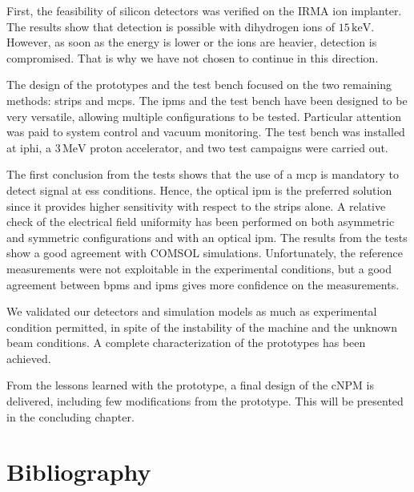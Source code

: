 \begin{refsection}
  First, the feasibility of silicon detectors was verified on the IRMA ion implanter. The results show that detection is possible with dihydrogen ions of $15\,\mathrm{keV}$. However, as soon as the energy is lower or the ions are heavier, detection is compromised. That is why we have not chosen to continue in this direction.

  The design of the prototypes and the test bench focused on the two remaining methods: strips and \acrshort{mcp}s. The \acrshort{ipm}s and the test bench have been designed to be very versatile, allowing multiple configurations to be tested. Particular attention was paid to system control and vacuum monitoring. The test bench was installed at \acrshort{iphi}, a $3\,\mathrm{MeV}$ proton accelerator, and two test campaigns were carried out.

  The first conclusion from the tests shows that the use of a \acrshort{mcp} is mandatory to detect signal at \acrshort{ess} conditions. Hence, the optical \acrshort{ipm} is the preferred solution since it provides higher sensitivity with respect to the strips alone. A relative check of the electrical field uniformity has been performed on both asymmetric and symmetric configurations and with an optical \acrshort{ipm}. The results from the tests show a good agreement with COMSOL simulations.
  Unfortunately, the reference measurements were not exploitable in the experimental conditions, but a good agreement between \acrshort{bpm}s and \acrshort{ipm}s gives more confidence on the measurements.

  We validated our detectors and simulation models as much as experimental condition permitted, in spite of the instability of the machine and the unknown beam conditions. A complete characterization of the prototypes has been achieved.

  From the lessons learned with the prototype, a final design of the cNPM is delivered, including few modifications from the prototype. This will be presented in the concluding chapter.

  \cleardoublepage
  \section{Bibliography}
  \label{ch4:bib}
  \printbibliography[heading=subbibliography]

\end{refsection}
